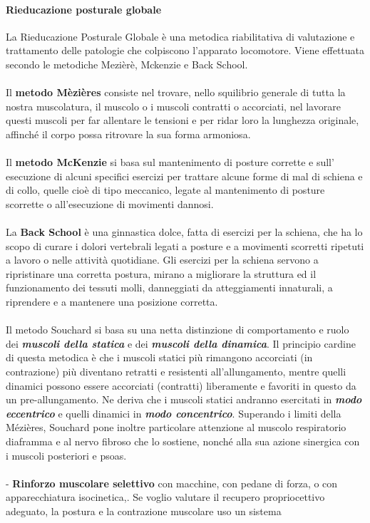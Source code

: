 \paragraph{Rieducazione posturale globale}


La Rieducazione Posturale Globale è una metodica riabilitativa di
valutazione e trattamento delle patologie che colpiscono l'apparato
locomotore. Viene effettuata secondo le metodiche Mezièrè, Mckenzie e
Back School.
\\\\
Il \textbf{metodo Mèzières} consiste nel trovare, nello squilibrio
generale di tutta la nostra muscolatura, il muscolo o i muscoli
contratti o accorciati, nel lavorare questi muscoli per far allentare le
tensioni e per ridar loro la lunghezza originale, affinché il corpo
possa ritrovare la sua forma armoniosa.
\\\\
Il \textbf{metodo McKenzie} si basa sul mantenimento di posture corrette
e sull' esecuzione di alcuni specifici esercizi per trattare alcune forme
di mal di schiena e di collo, quelle cioè di tipo meccanico, legate al
mantenimento di posture scorrette o all'esecuzione di movimenti dannosi.
\\\\
La \textbf{Back School} è una ginnastica dolce, fatta di esercizi per la
schiena, che ha lo scopo di curare i dolori vertebrali legati a posture
e a movimenti scorretti ripetuti a lavoro o nelle attività quotidiane.
Gli esercizi per la schiena servono a ripristinare una corretta postura,
mirano a migliorare la struttura ed il funzionamento dei tessuti molli,
danneggiati da atteggiamenti innaturali, a riprendere e a mantenere una
posizione corretta.
\\\\
Il metodo Souchard si basa su una netta distinzione di comportamento e
ruolo dei \emph{\textbf{muscoli della statica}} e dei
\emph{\textbf{muscoli della dinamica}}. Il principio cardine di questa
metodica è che i muscoli statici più rimangono accorciati (in
contrazione) più diventano retratti e resistenti all'allungamento,
mentre quelli dinamici possono essere accorciati (contratti) liberamente
e favoriti in questo da un pre-allungamento. Ne deriva che i muscoli
statici andranno esercitati in \emph{\textbf{modo eccentrico}} e quelli
dinamici in \emph{\textbf{modo concentrico}}. Superando i limiti della
Mézières, Souchard pone inoltre particolare attenzione al muscolo
respiratorio diaframma e al nervo fibroso che lo sostiene, nonché alla
sua azione sinergica con i muscoli posteriori e psoas.
\\\\
- \textbf{Rinforzo muscolare selettivo} con macchine, con pedane di
forza, o con apparecchiatura isocinetica,. Se voglio valutare il
recupero propriocettivo adeguato, la postura e la contrazione muscolare
uso un sistema

